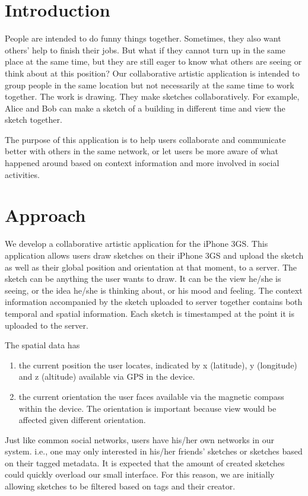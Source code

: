 \documentclass{chi2009}
\begin{document}
\section{Introduction}
People are intended to do funny things together. Sometimes, they also want others' help to finish their jobs. But what if they cannot turn up in the same place at the same time, but they are still eager to know what others are seeing or think about at this position? Our collaborative artistic application is intended to group people in the same location but not necessarily at the same time to work together. The work is drawing. They make sketches collaboratively. For example, Alice and Bob can make a sketch of a building in different time and view the sketch together.

The purpose of this application is to help users collaborate and communicate better with others in the same network, or let users be more aware of what happened around based on context information and more involved in social activities.

\section{Approach}
We develop a collaborative artistic application for the iPhone 3GS. This application allows users draw sketches on their iPhone 3GS and upload the sketch as well as their global position and orientation at that moment, to a server. The sketch can be anything the user wants to draw. It can be the view he/she is seeing, or the idea he/she is thinking about, or his mood and feeling. The context information accompanied by the sketch uploaded to server together contains both temporal and spatial information. Each sketch is timestamped at the point it is uploaded to the server.

The spatial data has
\begin{enumerate}
\item the current position the user locates, indicated by x (latitude), y
	(longitude) and z (altitude) available via GPS in the device.
\item the current orientation the user faces available via the magnetic compass
	within the device.  The orientation is important because view would be affected given different
         orientation.
\end{enumerate}


Just like common social networks, users have his/her own networks in our
system. i.e., one may only interested in his/her friends' sketches or sketches
based on their tagged metadata.  It is expected that the amount of created
sketches could quickly overload our small interface.  For this reason, we are
initially allowing sketches to be filtered based on tags and their creator.
\end{document}
